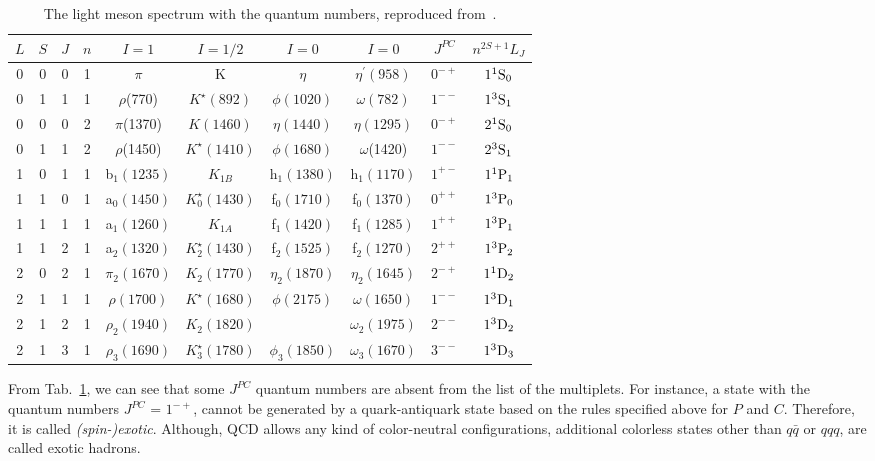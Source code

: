 \begin{table}[H]
    \centering
    \caption{The light meson spectrum with the quantum numbers, reproduced from~\cite{Tanabashi18}.}
    \label{tab.1.1}
    \begin{tabular}{cccccccccc}
        \hline
        $L$\qquad & $S$\qquad & $J$\qquad & $n$\qquad & $I=1$\qquad & $I=1/2$ \qquad & $I=0$\qquad & $I=0$\qquad & $J^{PC}$\qquad & $n^{2S+1}L_J$\qquad \\
        \hline
        0 & 0 & 0 & 1 & $\pi$ & K & $\eta$ & $\eta^{\prime}(958)$ & $0^{-+}$ & $\rm 1^1S_0$ \\
        0 & 1 & 1 & 1 & $\rho$(770) & $K^{\star}(892)$ & $\phi(1020)$ & $\omega(782)$ & $1^{--}$ & $\rm 1^3S_1$ \\
        \hline
        0 & 0 & 0 & 2 & $\pi$(1370) &  $K(1460)$  & $\eta (1440)$  & $\eta (1295)$ & $0^{-+}$ & $\rm 2^1S_0$\\
        0 & 1 & 1 & 2 & $\rho$(1450) & $K^{\star}(1410)$ & $\phi (1680)$ & $\omega$(1420) & $1^{--}$ & $\rm 2^3S_1$\\
        \hline        
        1 & 0 & 1 & 1 & b$_1(1235)$ & $K_{1B}$ & h$_1(1380)$ & h$_1(1170)$ \quad & $1^{+-}$ & $\rm 1^1P_1$\\
        1 & 1 & 0 & 1 & a$_0(1450)$ & $K_{0}^{\star}(1430)$ & f$_0(1710)$ & f$_0(1370)$ & $0^{++}$ & $\rm 1^3P_0$\\
        1 & 1 & 1 & 1 & a$_1(1260)$ & $K_{1A}$ & f$_1(1420)$ & f$_1(1285)$ & $1^{++}$ & $\rm 1^3P_1$\\
        1 & 1 & 2 & 1 & a$_2(1320)$ & $K_{2}^{\star}(1430)$ & f$_2(1525)$ & f$_2(1270)$ & $2^{++}$ & $\rm 1^3P_2$\\
        \hline
        2 & 0 & 2 & 1 & $\pi_2(1670)$ & $K_{2}(1770)$ & $\eta_2(1870)$ & $\eta_2(1645)$ & $2^{-+}$ & $\rm 1^1D_2$\\
        2 & 1 & 1 & 1 & $\rho(1700)$ & $K^{\star}(1680)$ & $\phi(2175)$ & $\omega(1650)$ & $1^{--}$ & $\rm 1^3D_1$\\
        2 & 1 & 2 & 1 & $\rho_2(1940)$ & $K_2(1820)$ &  & $\omega_2(1975)$ & $2^{--}$ & $\rm 1^3D_2$\\
        2 & 1 & 3 & 1 & $\rho_3(1690)$ & $K^{\star}_3(1780)$ & $\phi_3(1850)$ & $\omega_3(1670)$ & $3^{--}$ & $\rm 1^3D_3$\\
        \hline
    \end{tabular}
\end{table}

\noindent From Tab.~\ref{tab.1.1}, we can see that some $J^{PC}$ quantum numbers are absent from the list of the multiplets. For instance, a state with the quantum numbers $J^{PC}$ = $1^{-+}$, cannot be generated by a quark-antiquark state based on the rules specified above for $P$ and $C$. Therefore, it is called {\it (spin-)exotic}. Although, QCD allows any kind of color-neutral configurations, additional colorless states other than $q\bar{q}$ or $qqq$, are called exotic hadrons.


